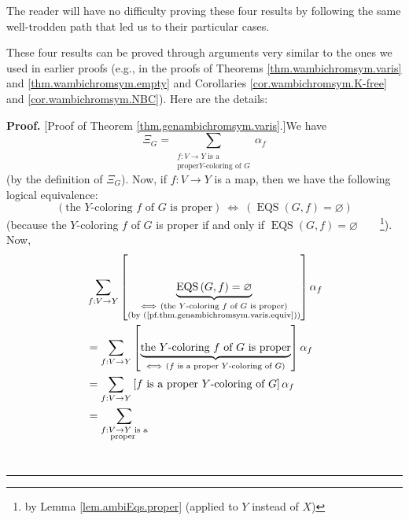 \documentclass[numbers=enddot,12pt,final,onecolumn,notitlepage]{scrartcl}%
\theoremstyle{definition}
\newenvironment{proof}[1][Proof]{\noindent\textbf{#1.} }{\ \rule{0.5em}{0.5em}}
\newenvironment{verlong}{}{}
\newenvironment{vershort}{}{}
\let\sumnonlimits\sum
\renewcommand{\sum}{\sumnonlimits\limits}
\begin{document}
\begin{vershort}
The reader will have no difficulty proving these four results by following the
same well-trodden path that led us to their particular cases.
\end{vershort}

\begin{verlong}
These four results can be proved through arguments very similar to the ones we
used in earlier proofs (e.g., in the proofs of Theorems
\ref{thm.wambichromsym.varis} and \ref{thm.wambichromsym.empty} and
Corollaries \ref{cor.wambichromsym.K-free} and \ref{cor.wambichromsym.NBC}).
Here are the details:

\begin{proof}
[Proof of Theorem \ref{thm.genambichromsym.varis}.]We have%
\begin{equation}
\Xi_{G}=\sum_{\substack{f:V\rightarrow Y\text{ is a}\\\text{proper
}Y\text{-coloring of }G}}\alpha_{f}
\label{pf.thm.genambichromsym.varis.XG-def}%
\end{equation}
(by the definition of $\Xi_{G}$). Now, if $f:V\rightarrow Y$ is a map, then we
have the following logical equivalence:%
\begin{equation}
\left(  \text{the }Y\text{-coloring }f\text{ of }G\text{ is proper}\right)
\ \Longleftrightarrow\ \left(  \operatorname*{EQS}\left(  G,f\right)
=\varnothing\right)  \label{pf.thm.genambichromsym.varis.equiv}%
\end{equation}
(because the $Y$-coloring $f$ of $G$ is proper if and only if
$\operatorname*{EQS}\left(  G,f\right)  =\varnothing$\ \ \ \ \footnote{by
Lemma \ref{lem.ambiEqs.proper} (applied to $Y$ instead of $X$)}). Now,%
\begin{align}
&  \sum_{f:V\rightarrow Y}\left[  \underbrace{\operatorname*{EQS}\left(
G,f\right)  =\varnothing}_{\substack{\Longleftrightarrow\ \left(  \text{the
}Y\text{-coloring }f\text{ of }G\text{ is proper}\right)  \\\text{(by
(\ref{pf.thm.genambichromsym.varis.equiv}))}}}\right]  \alpha_{f}\nonumber\\
&  =\sum_{f:V\rightarrow Y}\left[  \underbrace{\text{the }Y\text{-coloring
}f\text{ of }G\text{ is proper}}_{\Longleftrightarrow\ \left(  f\text{ is a
proper }Y\text{-coloring of }G\right)  }\right]  \alpha_{f}\nonumber\\
&  =\sum_{f:V\rightarrow Y}\left[  f\text{ is a proper }Y\text{-coloring of
}G\right]  \alpha_{f}\nonumber\\
&  =\sum_{\substack{f:V\rightarrow Y\text{ is a}\\\text{proper }%
}}
\end{align}
\end{proof}
\end{verlong}
\end{document}
